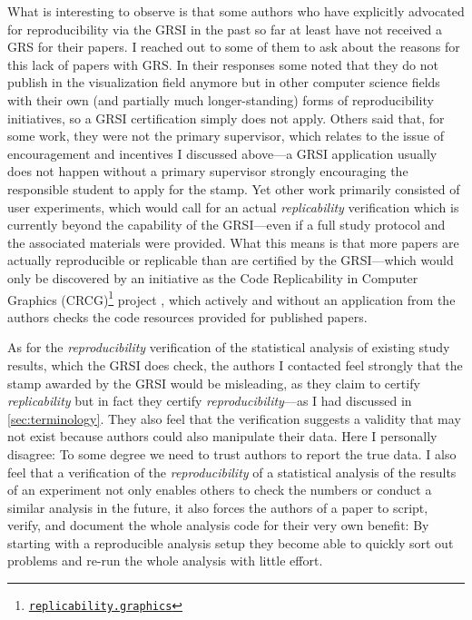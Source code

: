 \documentclass[conference,svgnames]{vgtc}                     %
\begin{document}
What is interesting to observe is that some authors who have explicitly advocated for reproducibility via the GRSI in the past so far at least have not received a GRS for their papers. I reached out to some of them to ask about the reasons for this lack of papers with GRS. In their responses some noted that they do not publish in the visualization field anymore but in other computer science fields with their own (and partially much lon\-ger-stan\-ding) forms of reproducibility initiatives, so a GRSI certification simply does not apply. Others said that, for some work, they were not the primary supervisor, which relates to the issue of encouragement and incentives I discussed above---a GRSI application usually does not happen without a primary supervisor strongly encouraging the responsible student to apply for the stamp. Yet other work primarily consisted of user experiments, which would call for an actual \emph{replicability} verification which is currently beyond the capability of the GRSI---even if a full study protocol and the associated materials were provided. What this means is that more papers are actually reproducible or replicable than are certified by the GRSI---which would only be discovered by an initiative as the Code Replicability in Computer Graphics (CRCG)\footnote{\href{https://replicability.graphics/}{\texttt{replicability.graphics}}} project \cite{Bonneel:2020:CRC}, which actively and without an application from the authors checks the code resources provided for published papers.

As for the \emph{reproducibility} verification of the statistical analysis of existing study results, which the GRSI does check, the authors I contacted feel strongly that the stamp awarded by the GRSI would be misleading, as they claim to certify \emph{replicability} but in fact they certify \emph{reproducibility}---as I had discussed in \autoref{sec:terminology}. They also feel that the verification suggests a validity that may not exist because authors could also manipulate their data. Here I personally disagree: To some degree we need to trust authors to report the true data. I also feel that a verification of the \emph{reproducibility} of a statistical analysis of the results of an experiment not only enables others to check the numbers or conduct a similar analysis in the future, it also forces the authors of a paper to script, verify, and document the whole analysis code for their very own benefit: By starting with a reproducible analysis setup they become able to quickly sort out problems and re-run the whole analysis with little effort.
\end{document}
